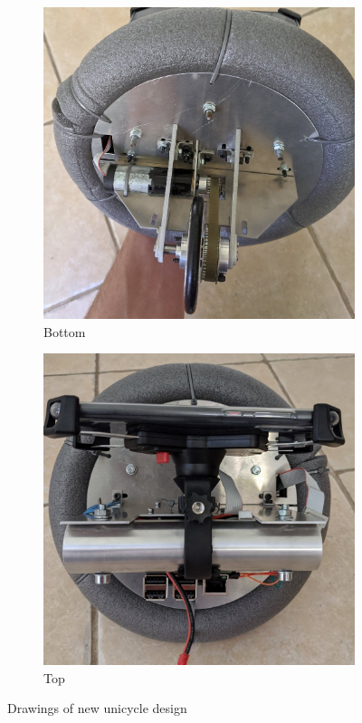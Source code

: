 \documentclass[twoside,twocolumn,12pt]{article}
\begin{document}
\begin{figure}[t!]
  \begin{subfigure}[t]{0.325\textwidth}
    \includegraphics[width=\linewidth]{botnew}
    \caption{Bottom}
  \label{sub:botnew}
  \end{subfigure}
  \begin{subfigure}[t]{0.325\textwidth}
    \includegraphics[width=\linewidth]{topnew}
    \caption{Top}
  \label{sub:topnew}
  \end{subfigure}
  
  \caption{Drawings of new unicycle design}
  \label{fig:drawings}
\end{figure}
\clearpage
\end{document}
